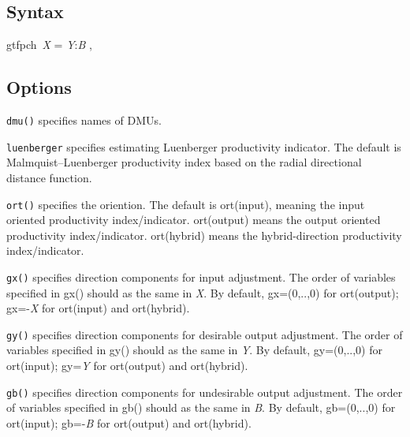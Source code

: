 \subsection{Syntax}
\begin{stsyntax}
	gtfpch\
	\textit{X\varlist} = \textit{Y\varlist}:\textit{B\varlist} \optif \optin,\
\end{stsyntax}


\subsection{Options}

\hangpara
{\tt dmu(\varname)} specifies names of DMUs. 

\hangpara
{\tt luenberger} specifies estimating Luenberger productivity indicator. The default is Malmquist–Luenberger productivity index based on the radial directional distance function.

\hangpara
{\tt ort(\ststring)} specifies the oriention. The default is ort(input), meaning the input oriented productivity index/indicator. ort(output) means the output oriented productivity index/indicator. ort(hybrid) means the hybrid-direction productivity index/indicator.

\hangpara
{\tt gx(\varlist)} specifies direction components for input adjustment. The order of variables specified in gx() should as the same in \textit{X\varlist}. By default, gx=(0,..,0) for ort(output); gx=-\textit{X\varlist} for ort(input) and ort(hybrid).

\hangpara
{\tt gy(\varlist)} specifies direction components for desirable output adjustment. The order of variables specified in gy() should as the same in \textit{Y\varlist}. By default, gy=(0,..,0) for ort(input); gy=\textit{Y\varlist} for ort(output) and ort(hybrid).

\hangpara
{\tt gb(\varlist)} specifies direction components for undesirable output adjustment. The order of variables specified in gb() should as the same in \textit{B\varlist}. By default, gb=(0,..,0) for ort(input); gb=-\textit{B\varlist} for ort(output) and ort(hybrid).

